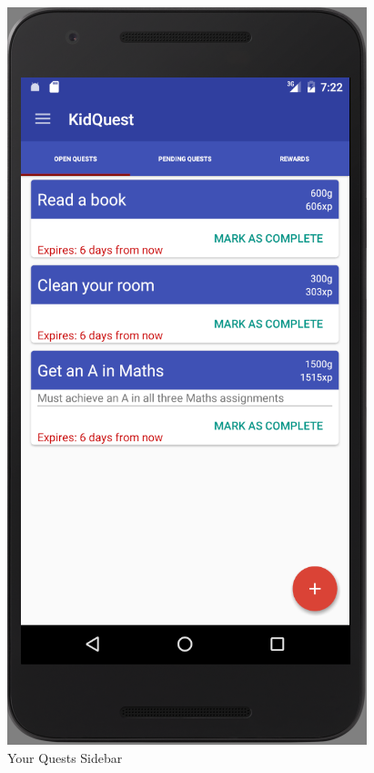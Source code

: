 \begin{figure}[ht]
\begin{minipage}[b]{0.45\linewidth}
    \includegraphics[width=.7\linewidth, frame]{../images/Screenshot/YourQuestsScreen.png}
    \caption{Your Quests Sidebar} 
    \vspace{4ex}
  \end{minipage} 
  \begin{minipage}[b]{0.45\linewidth}
    \centering

\end{minipage}
\end{figure}
